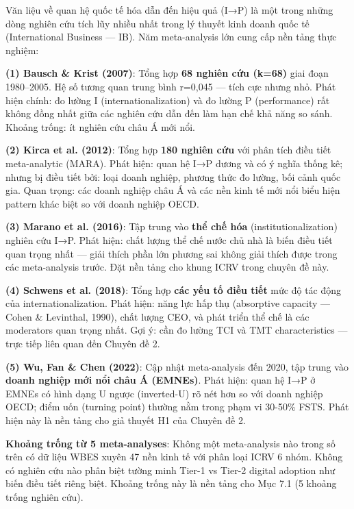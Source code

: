 \documentclass[12pt,a4paper]{article}
\begin{document}
Văn liệu về quan hệ quốc tế hóa dẫn đến hiệu quả (I→P) là một trong
những dòng nghiên cứu tích lũy nhiều nhất trong lý thuyết kinh doanh
quốc tế (International Business --- IB). Năm meta-analysis lớn cung cấp
nền tảng thực nghiệm:

\textbf{(1) Bausch \& Krist (2007)}: Tổng hợp \textbf{68 nghiên cứu
(k=68)} giai đoạn 1980--2005. Hệ số tương quan trung bình r=0,045 ---
tích cực nhưng nhỏ. Phát hiện chính: đo lường I (internationalization)
và đo lường P (performance) rất không đồng nhất giữa các nghiên cứu dẫn
đến làm hạn chế khả năng so sánh. Khoảng trống: ít nghiên cứu châu Á mới
nổi.

\textbf{(2) Kirca et al. (2012)}: Tổng hợp \textbf{180 nghiên cứu} với
phân tích điều tiết meta-analytic (MARA). Phát hiện: quan hệ I→P dương
và có ý nghĩa thống kê; nhưng bị điều tiết bởi: loại doanh nghiệp,
phương thức đo lường, bối cảnh quốc gia. Quan trọng: các doanh nghiệp
châu Á và các nền kinh tế mới nổi biểu hiện pattern khác biệt so với
doanh nghiệp OECD.

\textbf{(3) Marano et al. (2016)}: Tập trung vào \textbf{thể chế hóa}
(institutionalization) nghiên cứu I→P. Phát hiện: chất lượng thể chế
nước chủ nhà là biến điều tiết quan trọng nhất --- giải thích phần lớn
phương sai không giải thích được trong các meta-analysis trước. Đặt nền
tảng cho khung ICRV trong chuyên đề này.

\textbf{(4) Schwens et al. (2018)}: Tổng hợp \textbf{các yếu tố điều
tiết} mức độ tác động của internationalization. Phát hiện: năng lực hấp
thụ (absorptive capacity --- Cohen \& Levinthal, 1990), chất lượng CEO,
và phát triển thể chế là các moderators quan trọng nhất. Gợi ý: cần đo
lường TCI và TMT characteristics --- trực tiếp liên quan đến Chuyên đề
2.

\textbf{(5) Wu, Fan \& Chen (2022)}: Cập nhật meta-analysis đến 2020,
tập trung vào \textbf{doanh nghiệp mới nổi châu Á (EMNEs)}. Phát hiện:
quan hệ I→P ở EMNEs có hình dạng U ngược (inverted-U) rõ nét hơn so với
doanh nghiệp OECD; điểm uốn (turning point) thường nằm trong phạm vi
30-50\% FSTS. Phát hiện này là nền tảng cho giả thuyết H1 của Chuyên đề
2.

\textbf{Khoảng trống từ 5 meta-analyses}: Không một meta-analysis nào
trong số trên có dữ liệu WBES xuyên 47 nền kinh tế với phân loại ICRV 6
nhóm. Không có nghiên cứu nào phân biệt tường minh Tier-1 vs Tier-2
digital adoption như biến điều tiết riêng biệt. Khoảng trống này là nền
tảng cho Mục 7.1 (5 khoảng trống nghiên cứu).
\end{document}
